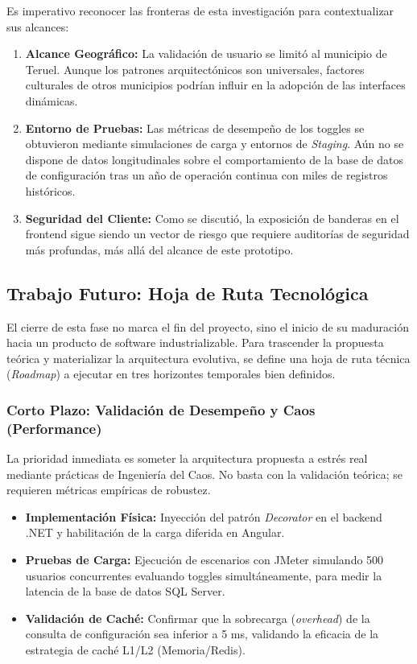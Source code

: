 Es imperativo reconocer las fronteras de esta investigación para contextualizar sus alcances:
\begin{enumerate}
    \item \textbf{Alcance Geográfico:} La validación de usuario se limitó al municipio de Teruel. Aunque los patrones arquitectónicos son universales, factores culturales de otros municipios podrían influir en la adopción de las interfaces dinámicas.
    \item \textbf{Entorno de Pruebas:} Las métricas de desempeño de los toggles se obtuvieron mediante simulaciones de carga y entornos de \textit{Staging}. Aún no se dispone de datos longitudinales sobre el comportamiento de la base de datos de configuración tras un año de operación continua con miles de registros históricos.
    \item \textbf{Seguridad del Cliente:} Como se discutió, la exposición de banderas en el frontend sigue siendo un vector de riesgo que requiere auditorías de seguridad más profundas, más allá del alcance de este prototipo.
\end{enumerate}

\subsection{Trabajo Futuro: Hoja de Ruta Tecnológica}

El cierre de esta fase no marca el fin del proyecto, sino el inicio de su maduración hacia un producto de software industrializable. Para trascender la propuesta teórica y materializar la arquitectura evolutiva, se define una hoja de ruta técnica (\textit{Roadmap}) a ejecutar en tres horizontes temporales bien definidos.

\subsubsection{Corto Plazo: Validación de Desempeño y Caos (Performance)}
La prioridad inmediata es someter la arquitectura propuesta a estrés real mediante prácticas de Ingeniería del Caos. No basta con la validación teórica; se requieren métricas empíricas de robustez.
\begin{itemize}
    \item \textbf{Implementación Física:} Inyección del patrón \textit{Decorator} en el backend .NET y habilitación de la carga diferida en Angular.
    \item \textbf{Pruebas de Carga:} Ejecución de escenarios con JMeter simulando 500 usuarios concurrentes evaluando toggles simultáneamente, para medir la latencia de la base de datos SQL Server.
    \item \textbf{Validación de Caché:} Confirmar que la sobrecarga (\textit{overhead}) de la consulta de configuración sea inferior a 5 ms, validando la eficacia de la estrategia de caché L1/L2 (Memoria/Redis).
\end{itemize}

